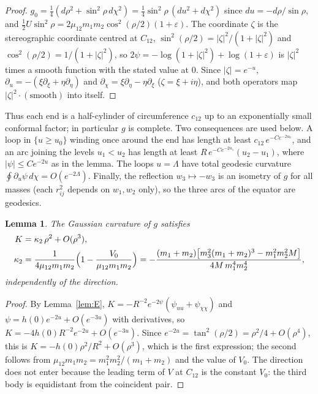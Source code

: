 \documentclass[11pt]{article}
\newtheorem{lemma}[theorem]{Lemma}
\theoremstyle{definition}
\begin{document}
\begin{proof}
$g_0=\tfrac14(d\rho^2+\sin^2\rho\,d\chi^2)=\tfrac14\sin^2\rho\,(du^2+d\chi^2)$ since $du=-d\rho/\sin\rho$, and
$\tfrac12U\sin^2\rho=2\mu_{12}m_1m_2\cos^2(\rho/2)(1+\varepsilon)$. The coordinate $\zeta$ is the stereographic coordinate
centred at $C_{12}$, $\sin^2(\rho/2)=|\zeta|^2/(1+|\zeta|^2)$ and $\cos^2(\rho/2)=1/(1+|\zeta|^2)$, so
$2\psi=-\log(1+|\zeta|^2)+\log(1+\varepsilon)$ is $|\zeta|^2$ times a smooth function with the stated value at $0$. Since
$|\zeta|=e^{-u}$, $\partial_u=-(\xi\partial_\xi+\eta\partial_\eta)$ and $\partial_\chi=\xi\partial_\eta-\eta\partial_\xi$
($\zeta=\xi+i\eta$), and both operators map $|\zeta|^2\cdot(\text{smooth})$ into itself.
\end{proof}

Thus each end is a half-cylinder of circumference $c_{12}$ up to an exponentially small conformal factor; in particular
$g$ is complete. Two consequences are used below. A loop in $\{u\ge u_0\}$ winding once around the end has length at
least $c_{12}\,e^{-Ce^{-2u_0}}$, and an arc joining the levels $u_1<u_2$ has length at least
$R\,e^{-Ce^{-2u_1}}(u_2-u_1)$, where $|\psi|\le Ce^{-2u}$ as in the lemma. The loops $u=\Lambda$ have total geodesic curvature $\oint\partial_u\psi\,d\chi=O(e^{-2\Lambda})$.
Finally, the reflection $w_3\mapsto-w_3$ is an isometry of $g$ for all masses (each $r_{ij}^2$ depends on $w_1,w_2$
only), so the three arcs of the equator are geodesics.

\begin{lemma}\label{lem:K}
The Gaussian curvature of $g$ satisfies
\begin{align*}
  K&=\kappa_2\,\rho^2+O(\rho^3),\\
  \kappa_2&=\frac{1}{4\mu_{12}m_1m_2}\Bigl(1-\frac{V_0}{\mu_{12}m_1m_2}\Bigr)
         =-\frac{(m_1+m_2)\bigl[m_3^2(m_1+m_2)^3-m_1^2m_2^2M\bigr]}{4M\,m_1^4m_2^4},
\end{align*}
independently of the direction.
\end{lemma}

\begin{proof}
By Lemma~\ref{lem:E}, $K=-R^{-2}e^{-2\psi}(\psi_{uu}+\psi_{\chi\chi})$ and $\psi=h(0)e^{-2u}+O(e^{-3u})$ with derivatives,
so $K=-4h(0)R^{-2}e^{-2u}+O(e^{-3u})$. Since $e^{-2u}=\tan^2(\rho/2)=\rho^2/4+O(\rho^4)$, this is
$K=-h(0)\rho^2/R^2+O(\rho^3)$, which is the first expression; the second follows from
$\mu_{12}m_1m_2=m_1^2m_2^2/(m_1+m_2)$ and the value of $V_0$. The direction does not enter because the leading term
of $V$ at $C_{12}$ is the constant $V_0$: the third body is equidistant from the coincident pair.
\end{proof}
\end{document}
